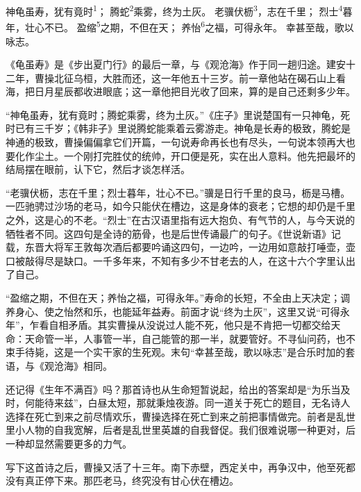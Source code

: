 
\begin{poem}
神龟虽寿，犹有竟时\textsuperscript{1}；
腾蛇\textsuperscript{2}乘雾，终为土灰。
老骥伏枥\textsuperscript{3}，志在千里；
烈士\textsuperscript{4}暮年，壮心不已。
盈缩\textsuperscript{5}之期，不但在天；
养怡\textsuperscript{6}之福，可得永年。
幸甚至哉，歌以咏志。
\end{poem}

\begin{annotations}
\end{annotations}

\begin{appreciation}
《龟虽寿》是《步出夏门行》的最后一章，与《观沧海》作于同一趟归途。建安十二年，曹操北征乌桓，大胜而还，这一年他五十三岁。前一章他站在碣石山上看海，把日月星辰都收进眼底；这一章他把目光收了回来，算的是自己还剩多少年。

“神龟虽寿，犹有竟时；腾蛇乘雾，终为土灰。”《庄子》里说楚国有一只神龟，死时已有三千岁；《韩非子》里说腾蛇能乘着云雾游走。神龟是长寿的极致，腾蛇是神通的极致，曹操偏偏拿它们开篇，一句说寿命再长也有尽头，一句说本领再大也要化作尘土。一个刚打完胜仗的统帅，开口便是死，实在出人意料。他先把最坏的结局摆在眼前，认下它，然后才谈怎样活。

“老骥伏枥，志在千里；烈士暮年，壮心不已。”骥是日行千里的良马，枥是马槽。一匹驰骋过沙场的老马，如今只能伏在槽边，这是身体的衰老；它想的却仍是千里之外，这是心的不老。“烈士”在古汉语里指有远大抱负、有气节的人，与今天说的牺牲者不同。这四句是全诗的筋骨，也是后世传诵最广的句子。《世说新语》记载，东晋大将军王敦每次酒后都要吟诵这四句，一边吟，一边用如意敲打唾壶，壶口被敲得尽是缺口。一千多年来，不知有多少不甘老去的人，在这十六个字里认出了自己。

“盈缩之期，不但在天；养怡之福，可得永年。”寿命的长短，不全由上天决定；调养身心、使之怡然和乐，也能延年益寿。前面才说“终为土灰”，这里又说“可得永年”，乍看自相矛盾。其实曹操从没说过人能不死，他只是不肯把一切都交给天命：天命管一半，人事管一半，自己能管的那一半，就要管好。不寻仙问药，也不束手待毙，这是一个实干家的生死观。末句“幸甚至哉，歌以咏志”是合乐时加的套语，与《观沧海》相同。

还记得《生年不满百》吗？那首诗也从生命短暂说起，给出的答案却是“为乐当及时，何能待来兹”，白昼太短，那就秉烛夜游。同一道关于死亡的题目，无名诗人选择在死亡到来之前尽情欢乐，曹操选择在死亡到来之前把事情做完。前者是乱世里小人物的自我宽解，后者是乱世里英雄的自我督促。我们很难说哪一种更对，后一种却显然需要更多的力气。

写下这首诗之后，曹操又活了十三年。南下赤壁，西定关中，再争汉中，他至死都没有真正停下来。那匹老马，终究没有甘心伏在槽边。
\end{appreciation}
